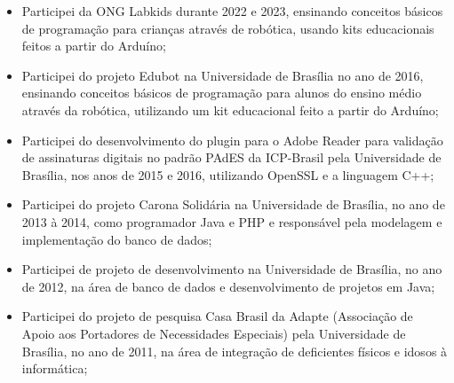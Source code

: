 \begin{itemize}
    \item Participei da ONG Labkids durante 2022 e 2023, ensinando conceitos básicos de programação para crianças através de robótica, usando kits educacionais feitos a partir do Arduíno;
    \item Participei do projeto Edubot na Universidade de Brasília no ano de 2016, ensinando conceitos básicos de programação para alunos do ensino médio através da robótica, utilizando um kit educacional feito a partir do Arduíno;
    \item Participei do desenvolvimento do plugin para o Adobe Reader para validação de assinaturas digitais no padrão PAdES da ICP-Brasil pela Universidade de Brasília, nos anos de 2015 e 2016, utilizando OpenSSL e a linguagem C++;
    \item Participei do projeto Carona Solidária na Universidade de Brasília, no ano de 2013 à 2014, como programador Java e PHP e responsável pela modelagem e implementação do banco de dados;
    \item Participei de projeto de desenvolvimento na Universidade de Brasília, no ano de 2012, na área de banco de dados e desenvolvimento de projetos em Java;
    \item Participei do projeto de pesquisa Casa Brasil da Adapte (Associação de Apoio aos Portadores de Necessidades Especiais) pela Universidade de Brasília, no ano de 2011, na área de integração de deficientes físicos e idosos à informática;
\end{itemize}